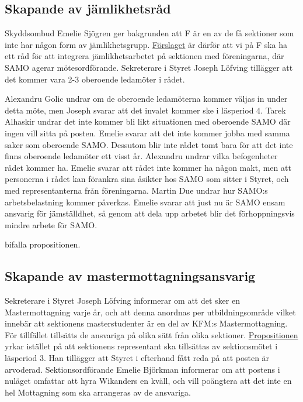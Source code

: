 \documentclass[hidelinks]{sektionsmote} %
\begin{document}
\subsection{Skapande av jämlikhetsråd}
Skyddsombud Emelie Sjögren ger bakgrunden att F är en av de få sektioner som inte har någon form av jämlikhetsgrupp.
\hyperlink{bilagor/propjaemf.pdf.1}{Förslaget} är därför att vi på F ska ha ett råd för att integrera jämlikhetsarbetet på sektionen med föreningarna, där SAMO agerar mötesordförande.
Sekreterare i Styret Joseph Löfving tillägger att det kommer vara 2-3 oberoende ledamöter i rådet.

Alexandru Golic undrar om de oberoende ledamöterna kommer väljas in under detta möte, men Joseph svarar att det invalet kommer ske i läsperiod 4.
Tarek Alhaskir undrar det inte kommer bli likt situationen med oberoende SAMO där ingen vill sitta på posten.
Emelie svarar att det inte kommer jobba med samma saker som oberoende SAMO.
Dessutom blir inte rådet tomt bara för att det inte finns oberoende ledamöter ett visst år.
Alexandru undrar vilka befogenheter rådet kommer ha.
Emelie svarar att rådet inte kommer ha någon makt, men att personerna i rådet kan förankra sina åsikter hos SAMO som sitter i Styret, och med representanterna från föreningarna.
Martin Due undrar hur SAMO:s arbetsbelastning kommer påverkas.
Emelie svarar att just nu är SAMO ensam ansvarig för jämställdhet, så genom att dela upp arbetet blir det förhoppningsvis mindre arbete för SAMO.

\begin{beslut}
  \item bifalla propositionen.
\end{beslut}

\subsection{Skapande av mastermottagningsansvarig}
Sekreterare i Styret Joseph Löfving informerar om att det sker en Mastermottagning varje år, och att denna anordnas per utbildningsområde vilket innebär att sektionens masterstudenter är en del av KFM:s Mastermottagning.
För tillfället tillsätts de ansvariga på olika sätt från olika sektioner.
\hyperlink{bilagor/propmma.pdf.1}{Propositionen} yrkar istället på att sektionens representant ska tillsättas av sektionsmötet i läsperiod 3.
Han tillägger att Styret i efterhand fått reda på att posten är arvoderad.
Sektionsordförande Emelie Björkman informerar om att postens i nuläget omfattar att hyra Wikanders en kväll, och vill poängtera att det inte en hel Mottagning som ska arrangeras av de ansvariga.
\end{document}
